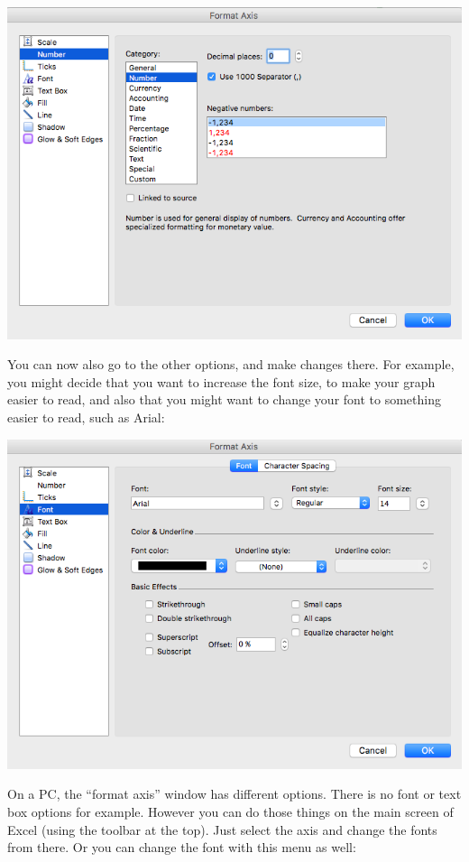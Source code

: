 \documentclass[
]{book}
\begin{document}
\includegraphics{imgs/desc_viz_8.png}

You can now also go to the other options, and make changes there. For example, you might decide that you want to increase the font size, to make your graph easier to read, and also that you might want to change your font to something easier to read, such as Arial:

\includegraphics{imgs/desc_viz_9.png}

On a PC, the ``format axis'' window has different options. There is no font or text box options for example. However you can do those things on the main screen of Excel (using the toolbar at the top). Just select the axis and change the fonts from there. Or you can change the font with this menu as well:
\end{document}
